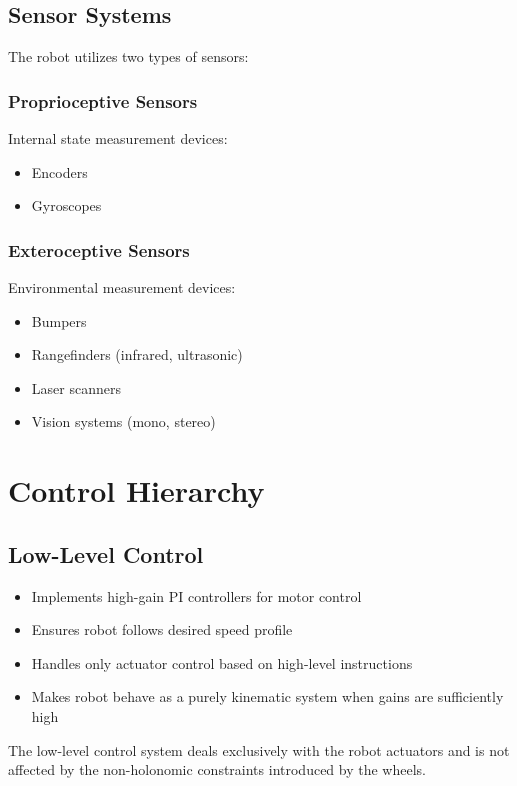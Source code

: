 \documentclass[openany]{book}
\theoremstyle{definition}
\theoremstyle{remark}
\newcommand{\note}[1]{
\begin{tcolorbox}[colback=green!5,colframe=green!40!black,title=Note]
 #1
\end{tcolorbox}
}
\begin{document}
\subsection{Sensor Systems}

The robot utilizes two types of sensors:

\subsubsection{Proprioceptive Sensors}
Internal state measurement devices:
\begin{itemize}
    \item Encoders
    \item Gyroscopes
\end{itemize}

\subsubsection{Exteroceptive Sensors}
Environmental measurement devices:
\begin{itemize}
    \item Bumpers
    \item Rangefinders (infrared, ultrasonic)
    \item Laser scanners
    \item Vision systems (mono, stereo)
\end{itemize}

\section{Control Hierarchy}

\subsection{Low-Level Control}
\begin{itemize}
    \item Implements high-gain PI controllers for motor control
    \item Ensures robot follows desired speed profile
    \item Handles only actuator control based on high-level instructions
    \item Makes robot behave as a purely kinematic system when gains are sufficiently high
\end{itemize}

\note{The low-level control system deals exclusively with the robot actuators and is not affected by the non-holonomic constraints introduced by the wheels.}
\end{document}
